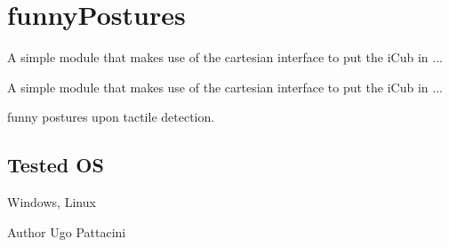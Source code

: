 \section{funny\+Postures}
\label{group__icub__funnyPostures}


A simple module that makes use of the cartesian interface to put the i\+Cub in ...  


A simple module that makes use of the cartesian interface to put the i\+Cub in ... 

funny postures upon tactile detection.\hypertarget{group__icub__tld_tested_os_sec}{}\subsection{Tested O\+S}\label{group__icub__tld_tested_os_sec}
Windows, Linux

\begin{DoxyAuthor}{Author}
Ugo Pattacini 
\end{DoxyAuthor}
